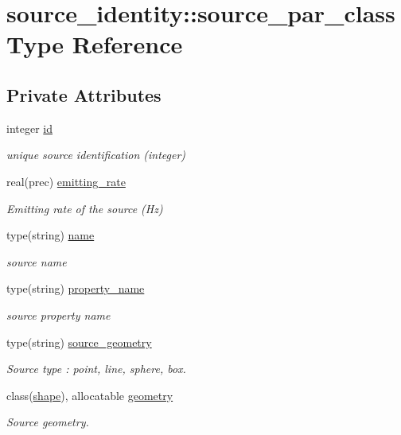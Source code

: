\hypertarget{structsource__identity_1_1source__par__class}{}\section{source\+\_\+identity\+:\+:source\+\_\+par\+\_\+class Type Reference}
\label{structsource__identity_1_1source__par__class}
\subsection*{Private Attributes}
\begin{DoxyCompactItemize}
\item 
integer \mbox{\hyperlink{structsource__identity_1_1source__par__class_abde865686b1a6cfa7838aec95af3a7a1}{id}}
\begin{DoxyCompactList}\small\item\em unique source identification (integer) \end{DoxyCompactList}\item 
real(prec) \mbox{\hyperlink{structsource__identity_1_1source__par__class_a26353d5ad314f4214d45e9258412130e}{emitting\+\_\+rate}}
\begin{DoxyCompactList}\small\item\em Emitting rate of the source (Hz) \end{DoxyCompactList}\item 
type(string) \mbox{\hyperlink{structsource__identity_1_1source__par__class_a31d0608c32137ff27d27c0d5ff1b2d87}{name}}
\begin{DoxyCompactList}\small\item\em source name \end{DoxyCompactList}\item 
type(string) \mbox{\hyperlink{structsource__identity_1_1source__par__class_af8c325e348c702375d57c2c37d061e45}{property\+\_\+name}}
\begin{DoxyCompactList}\small\item\em source property name \end{DoxyCompactList}\item 
type(string) \mbox{\hyperlink{structsource__identity_1_1source__par__class_ab0cf94daa109813789aaeb280faa8dc0}{source\+\_\+geometry}}
\begin{DoxyCompactList}\small\item\em Source type \+: \textquotesingle{}point\textquotesingle{}, \textquotesingle{}line\textquotesingle{}, \textquotesingle{}sphere\textquotesingle{}, \textquotesingle{}box\textquotesingle{}. \end{DoxyCompactList}\item 
class(\mbox{\hyperlink{structgeometry_1_1shape}{shape}}), allocatable \mbox{\hyperlink{structsource__identity_1_1source__par__class_ae94237cd7ecb262db820869f2049c295}{geometry}}
\begin{DoxyCompactList}\small\item\em Source geometry. \end{DoxyCompactList}\end{DoxyCompactItemize}


